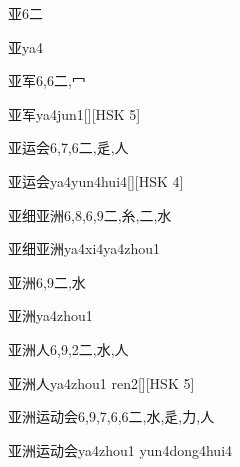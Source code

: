 \begin{Entry}{亚}{6}{⼆}
  \begin{Phonetics}{亚}{ya4}
  \end{Phonetics}
\end{Entry}

\begin{Entry}{亚军}{6,6}{⼆,⼍}
  \begin{Phonetics}{亚军}{ya4jun1}[][HSK 5]
  \end{Phonetics}
\end{Entry}

\begin{Entry}{亚运会}{6,7,6}{⼆,⾡,⼈}
  \begin{Phonetics}{亚运会}{ya4yun4hui4}[][HSK 4]
  \end{Phonetics}
\end{Entry}

\begin{Entry}{亚细亚洲}{6,8,6,9}{⼆,⽷,⼆,⽔}
  \begin{Phonetics}{亚细亚洲}{ya4xi4ya4zhou1}
  \end{Phonetics}
\end{Entry}

\begin{Entry}{亚洲}{6,9}{⼆,⽔}
  \begin{Phonetics}{亚洲}{ya4zhou1}
  \end{Phonetics}
\end{Entry}

\begin{Entry}{亚洲人}{6,9,2}{⼆,⽔,⼈}
  \begin{Phonetics}{亚洲人}{ya4zhou1 ren2}[][HSK 5]
  \end{Phonetics}
\end{Entry}

\begin{Entry}{亚洲运动会}{6,9,7,6,6}{⼆,⽔,⾡,⼒,⼈}
  \begin{Phonetics}{亚洲运动会}{ya4zhou1 yun4dong4hui4}
  \end{Phonetics}
\end{Entry}

